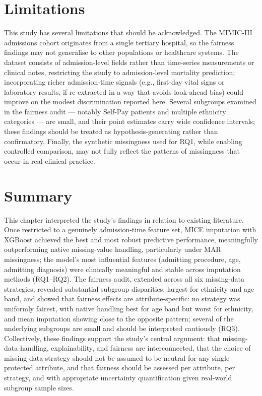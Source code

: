 \documentclass[12pt,a4paper]{report}
\begin{document}
\section{Limitations}
This study has several limitations that should be acknowledged. The MIMIC-III admissions cohort originates from a single tertiary hospital, so the fairness findings may not generalise to other populations or healthcare systems. The dataset consists of admission-level fields rather than time-series measurements or clinical notes, restricting the study to admission-level mortality prediction; incorporating richer admission-time signals (e.g., first-day vital signs or laboratory results, if re-extracted in a way that avoids look-ahead bias) could improve on the modest discrimination reported here. Several subgroups examined in the fairness audit --- notably Self-Pay patients and multiple ethnicity categories --- are small, and their point estimates carry wide confidence intervals; these findings should be treated as hypothesis-generating rather than confirmatory. Finally, the synthetic missingness used for RQ1, while enabling controlled comparison, may not fully reflect the patterns of missingness that occur in real clinical practice.


\section{Summary}
This chapter interpreted the study's findings in relation to existing literature. Once restricted to a genuinely admission-time feature set, MICE imputation with XGBoost achieved the best and most robust predictive performance, meaningfully outperforming native missing-value handling, particularly under MAR missingness; the model's most influential features (admitting procedure, age, admitting diagnosis) were clinically meaningful and stable across imputation methods (RQ1--RQ2). The fairness audit, extended across all six missing-data strategies, revealed substantial subgroup disparities, largest for ethnicity and age band, and showed that fairness effects are attribute-specific: no strategy was uniformly fairest, with native handling best for age band but worst for ethnicity, and mean imputation showing close to the opposite pattern; several of the underlying subgroups are small and should be interpreted cautiously (RQ3). Collectively, these findings support the study's central argument: that missing-data handling, explainability, and fairness are interconnected, that the choice of missing-data strategy should not be assumed to be neutral for any single protected attribute, and that fairness should be assessed per attribute, per strategy, and with appropriate uncertainty quantification given real-world subgroup sample sizes.
\end{document}
